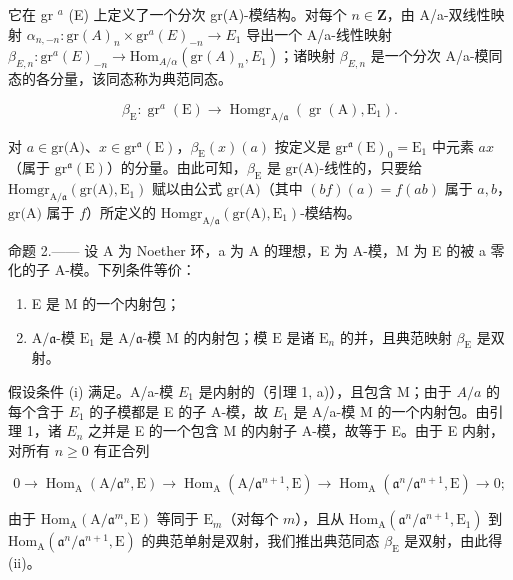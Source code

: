 它在 gr \(^{a}\) (E) 上定义了一个分次 gr(A)-模结构。对每个 \(n \in \mathbf{Z}\)，由 A/a-双线性映射 \(\alpha_{n,-n} : \text{gr}(A)_n \times \text{gr}^{a}(E)_{-n} \longrightarrow E_1\) 导出一个 A/a-线性映射 \(\beta_{E,n} : \text{gr}^{a}(E)_{-n} \longrightarrow \text{Hom}_{A/\alpha}(\text{gr}(A)_n, E_1)\)；诸映射 \(\beta_{E,n}\) 是一个分次 A/a-模同态的各分量，该同态称为典范同态。

\[
\beta_ {\mathrm{E}}: \operatorname{gr} ^ {a} (\mathrm{E}) \longrightarrow \operatorname{Homgr} _ {\mathrm{A} / \mathfrak{a}} (\operatorname{gr} (\mathrm{A}), \mathrm{E} _ {1}).\tag{2}
\]

对 \(a \in \text{gr(A)}\)、\(x \in \text{gr}^{\mathfrak{a}}(\text{E})\)，\(\beta_{\text{E}}(x)(a)\) 按定义是 \(\text{gr}^{\mathfrak{a}}(\text{E})_0 = \text{E}_1\) 中元素 \(ax\)（属于 \(\text{gr}^{\mathfrak{a}}(\text{E})\)）的分量。由此可知，\(\beta_{\text{E}}\) 是 \(\text{gr(A)}\)-线性的，只要给 \(\text{Homgr}_{\text{A}/\mathfrak{a}}(\text{gr(A)}, \text{E}_1)\) 赋以由公式 \(\text{gr(A)}\)（其中 \((bf)(a) = f(ab)\) 属于 \(a, b\)，\(\text{gr(A)}\) 属于 \(f\)）所定义的 \(\text{Homgr}_{\text{A}/\mathfrak{a}}(\text{gr(A)}, \text{E}_1)\)-模结构。

命题 2.—— 设 A 为 Noether 环，a 为 A 的理想，E 为 A-模，M 为 E 的被 a 零化的子 A-模。下列条件等价：

\begin{enumerate}
\def\labelenumi{(\roman{enumi})}
\item
  E 是 M 的一个内射包；
\item
  \(\mathrm{A}/\mathfrak{a}\)-模 \(\mathrm{E}_1\) 是 \(\mathrm{A}/\mathfrak{a}\)-模 \(\mathrm{M}\) 的内射包；模 \(\mathrm{E}\) 是诸 \(\mathrm{E}_n\) 的并，且典范映射 \(\beta_{\mathrm{E}}\) 是双射。
\end{enumerate}

假设条件 (i) 满足。A/a-模 \(E_{1}\) 是内射的（引理 1, a)），且包含 M；由于 \(A/a\) 的每个含于 \(E_{1}\) 的子模都是 E 的子 A-模，故 \(E_{1}\) 是 A/a-模 M 的一个内射包。由引理 1，诸 \(E_{n}\) 之并是 E 的一个包含 M 的内射子 A-模，故等于 E。由于 E 内射，对所有 \(n \geqslant 0\) 有正合列

\[
0 \to \operatorname{Hom} _ {\mathrm{A}} (\mathrm{A} / \mathfrak {a} ^ {n}, \mathrm{E}) \longrightarrow \operatorname{Hom} _ {\mathrm{A}} (\mathrm{A} / \mathfrak {a} ^ {n + 1}, \mathrm{E}) \longrightarrow \operatorname{Hom} _ {\mathrm{A}} (\mathfrak {a} ^ {n} / \mathfrak {a} ^ {n + 1}, \mathrm{E}) \to 0;
\]

由于 \(\mathrm{Hom}_{\mathrm{A}}(\mathrm{A}/\mathfrak{a}^{m},\mathrm{E})\) 等同于 \(\mathrm{E}_{m}\)（对每个 \(m\)），且从 \(\mathrm{Hom}_{\mathrm{A}}(\mathfrak{a}^{n}/\mathfrak{a}^{n+1},\mathrm{E}_{1})\) 到 \(\mathrm{Hom}_{\mathrm{A}}(\mathfrak{a}^{n}/\mathfrak{a}^{n+1},\mathrm{E})\) 的典范单射是双射，我们推出典范同态 \(\beta_{\mathrm{E}}\) 是双射，由此得 (ii)。

